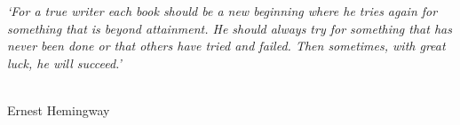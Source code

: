 \clearpage

\narrowlinespacing

\vspace*{4mm}
\emph{`For a true writer each book should be a new beginning where he tries again for something that is beyond attainment. He should always try for something that has never been done or that others have tried and failed. Then sometimes, with great luck, he will succeed.'}\\
\\

\normallinespacing

\hfill \hfill Ernest Hemingway